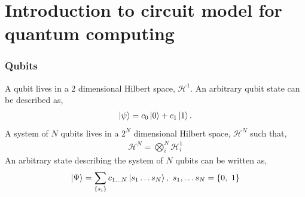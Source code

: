 \documentclass{beamer}
\newcommand{\mc}{\mathcal}
\renewcommand{\(}{\left(}
\renewcommand{\)}{\right)}
\renewcommand{\[}{\left[}
\renewcommand{\]}{\right]}
\begin{document}
\section{Introduction to circuit model for quantum computing}

\begin{frame}
    \frametitle{Qubits}
    A qubit lives in a 2 dimensional Hilbert space, $\mc H^1$. An arbitrary qubit state can be described as, 
    \begin{align*}
        \ket{\psi} = c_0 \ket{0} + c_1 \ket{1}.
    \end{align*}
    \pause
    A system of $N$ qubits lives in a $2^N$ dimensional Hilbert space, $\mc H^N$ such that, 
    \begin{align*}
        \mc H^N = \bigotimes_i^N \mc H^1_i
    \end{align*}
    An arbitrary state describing the system of $N$ qubits can be written as, 
    \begin{align*}
        \ket{\Psi} = \sum_{\{s_i\}} c_{1 \dots N} \ket{s_1 \dots s_N}, \ s_1, \dots s_N = \{0, \ 1\}
    \end{align*}

\end{frame}
\end{document}
